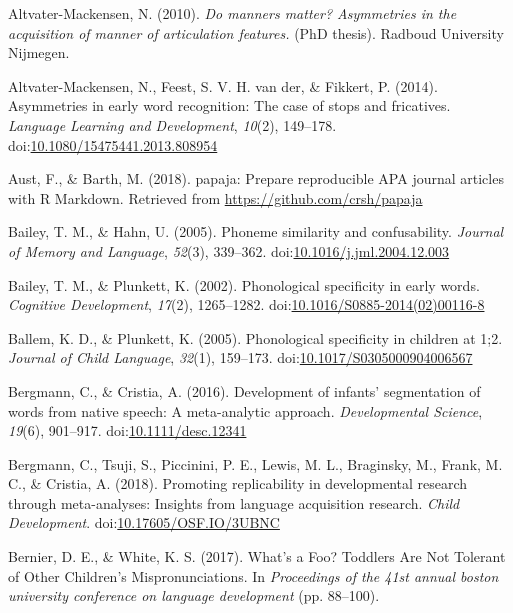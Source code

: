 \documentclass[
  man, noextraspace]{apa6}
\begin{document}
\leavevmode\hypertarget{ref-Altvater2010}{}%
Altvater-Mackensen, N. (2010). \emph{Do manners matter? Asymmetries in the acquisition of manner of articulation features.} (PhD thesis). Radboud University Nijmegen.

\leavevmode\hypertarget{ref-Altvater2014}{}%
Altvater-Mackensen, N., Feest, S. V. H. van der, \& Fikkert, P. (2014). Asymmetries in early word recognition: The case of stops and fricatives. \emph{Language Learning and Development}, \emph{10}(2), 149--178. doi:\href{https://doi.org/10.1080/15475441.2013.808954}{10.1080/15475441.2013.808954}

\leavevmode\hypertarget{ref-papaja}{}%
Aust, F., \& Barth, M. (2018). papaja: Prepare reproducible APA journal articles with R Markdown. Retrieved from \url{https://github.com/crsh/papaja}

\leavevmode\hypertarget{ref-Bailey2005}{}%
Bailey, T. M., \& Hahn, U. (2005). Phoneme similarity and confusability. \emph{Journal of Memory and Language}, \emph{52}(3), 339--362. doi:\href{https://doi.org/10.1016/j.jml.2004.12.003}{10.1016/j.jml.2004.12.003}

\leavevmode\hypertarget{ref-Bailey2002}{}%
Bailey, T. M., \& Plunkett, K. (2002). Phonological specificity in early words. \emph{Cognitive Development}, \emph{17}(2), 1265--1282. doi:\href{https://doi.org/10.1016/S0885-2014(02)00116-8}{10.1016/S0885-2014(02)00116-8}

\leavevmode\hypertarget{ref-Ballem2005}{}%
Ballem, K. D., \& Plunkett, K. (2005). Phonological specificity in children at 1;2. \emph{Journal of Child Language}, \emph{32}(1), 159--173. doi:\href{https://doi.org/10.1017/S0305000904006567}{10.1017/S0305000904006567}

\leavevmode\hypertarget{ref-Bergmann2016}{}%
Bergmann, C., \& Cristia, A. (2016). Development of infants' segmentation of words from native speech: A meta-analytic approach. \emph{Developmental Science}, \emph{19}(6), 901--917. doi:\href{https://doi.org/10.1111/desc.12341}{10.1111/desc.12341}

\leavevmode\hypertarget{ref-Bergmann2018}{}%
Bergmann, C., Tsuji, S., Piccinini, P. E., Lewis, M. L., Braginsky, M., Frank, M. C., \& Cristia, A. (2018). Promoting replicability in developmental research through meta-analyses: Insights from language acquisition research. \emph{Child Development}. doi:\href{https://doi.org/10.17605/OSF.IO/3UBNC}{10.17605/OSF.IO/3UBNC}

\leavevmode\hypertarget{ref-Bernier2017}{}%
Bernier, D. E., \& White, K. S. (2017). What's a Foo? Toddlers Are Not Tolerant of Other Children's Mispronunciations. In \emph{Proceedings of the 41st annual boston university conference on language development} (pp. 88--100).
\end{document}
